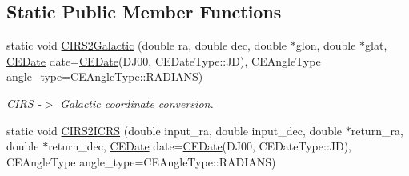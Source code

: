 \subsection*{Static Public Member Functions}
\begin{DoxyCompactItemize}
\item 
\hypertarget{class_c_e_coordinates_acc48a4431787fe52fe5c09d0dd088732}{}static void \hyperlink{class_c_e_coordinates_acc48a4431787fe52fe5c09d0dd088732}{C\+I\+R\+S2\+Galactic} (double ra, double dec, double $\ast$glon, double $\ast$glat, \hyperlink{class_c_e_date}{C\+E\+Date} date=\hyperlink{class_c_e_date}{C\+E\+Date}(D\+J00, C\+E\+Date\+Type\+::\+J\+D), C\+E\+Angle\+Type angle\+\_\+type=C\+E\+Angle\+Type\+::\+R\+A\+D\+I\+A\+N\+S)\label{class_c_e_coordinates_acc48a4431787fe52fe5c09d0dd088732}

\begin{DoxyCompactList}\small\item\em C\+I\+R\+S -\/$>$ Galactic coordinate conversion. \end{DoxyCompactList}\item 
\hypertarget{class_c_e_coordinates_a8330914a9a58924993ddf3daf65a0ed0}{}static void \hyperlink{class_c_e_coordinates_a8330914a9a58924993ddf3daf65a0ed0}{C\+I\+R\+S2\+I\+C\+R\+S} (double input\+\_\+ra, double input\+\_\+dec, double $\ast$return\+\_\+ra, double $\ast$return\+\_\+dec, \hyperlink{class_c_e_date}{C\+E\+Date} date=\hyperlink{class_c_e_date}{C\+E\+Date}(D\+J00, C\+E\+Date\+Type\+::\+J\+D), C\+E\+Angle\+Type angle\+\_\+type=C\+E\+Angle\+Type\+::\+R\+A\+D\+I\+A\+N\+S)\label{class_c_e_coordinates_a8330914a9a58924993ddf3daf65a0ed0}


\end{DoxyCompactItemize}
